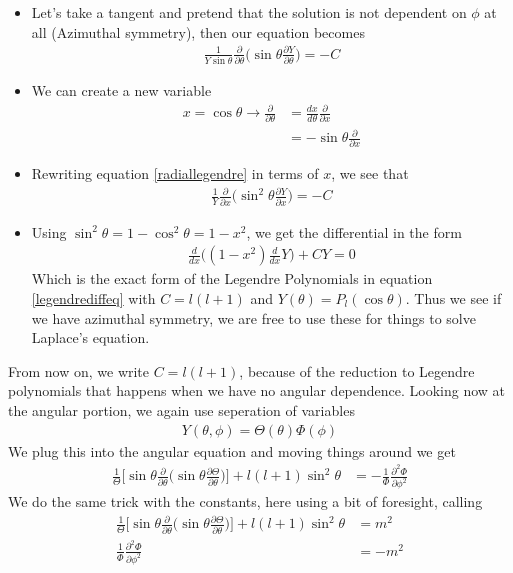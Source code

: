 \begin{itemize}
\item Let's take a tangent and pretend that the solution is not dependent on $\phi$ at all (Azimuthal symmetry), then our equation becomes
\begin{align}\label{radiallegendre}
\frac{1}{Y\sin\theta}\frac{\partial}{\partial \theta}\Big(\sin\theta\frac{\partial Y}{\partial\theta}\Big) =-C
\end{align}
\item We can create a new variable
\begin{align}\label{xsub}
x = \cos\theta \rightarrow \frac{\partial}{\partial\theta} &=\frac{dx}{d\theta} \frac{\partial}{\partial x}\\
&= -\sin\theta\frac{\partial}{\partial x}
\end{align}
\item Rewriting equation \ref{radiallegendre} in terms of $x$, we see that
\begin{align}
\frac{1}{Y}\frac{\partial}{\partial x}\Big(\sin^2\theta\frac{\partial Y}{\partial x}\Big) = -C
\end{align}
\item Using $\sin^2\theta = 1-\cos^2\theta = 1-x^2$, we get the differential in the form
\begin{align}
\frac{d}{dx}\Big((1-x^2)\frac{d}{dx}Y\Big) + CY = 0
\end{align}
Which is the exact form of the Legendre Polynomials in equation \ref{legendrediffeq} with $C = l(l+1)$ and $Y(\theta) = P_l(\cos\theta)$. Thus we see if we have azimuthal symmetry, we are free to use these for things to solve Laplace's equation.
\end{itemize}
From now on, we write $C = l(l+1)$, because of the reduction to Legendre polynomials that happens when we have no angular dependence. Looking now at the angular portion, we again use seperation of variables
\begin{align}
Y(\theta,\phi) = \Theta(\theta)\Phi(\phi)
\end{align}
We plug this into the angular equation and moving things around we get
\begin{align}
\frac{1}{\Theta}\Big[\sin\theta\frac{\partial}{\partial\theta}\Big(\sin\theta\frac{\partial \Theta}{\partial\theta}\Big)\Big] +l(l+1)\sin^2\theta  &= -\frac{1}{\Phi}\frac{\partial^2 \Phi}{\partial\phi^2}
\end{align}
We do the same trick with the constants, here using a bit of foresight, calling 
\begin{align}
\frac{1}{\Theta}\Big[\sin\theta\frac{\partial}{\partial\theta}\Big(\sin\theta\frac{\partial \Theta}{\partial\theta}\Big)\Big] +l(l+1)\sin^2\theta &= m^2\\
\frac{1}{\Phi}\frac{\partial^2 \Phi}{\partial\phi^2} &= -m^2
\end{align}
